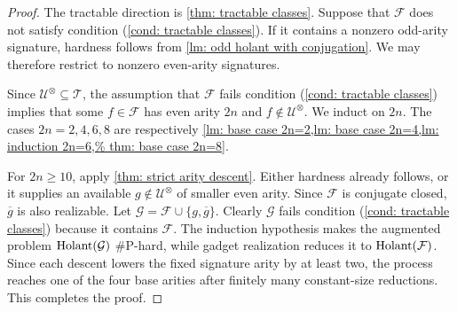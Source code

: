 \begin{proof}
The tractable direction is \cref{thm: tractable classes}.  Suppose that
$\mathcal F$ does not satisfy condition
\rm{(\ref{cond: tractable classes})}.  If it contains a nonzero odd-arity
signature, hardness follows from
\cref{lm: odd holant with conjugation}.  We may therefore restrict to
nonzero even-arity signatures.

Since $\mathcal U^{\otimes}\subseteq\mathscr T$, the assumption that
$\mathcal F$ fails condition \rm{(\ref{cond: tractable classes})} implies
that some $f\in\mathcal F$ has even arity $2n$ and
$f\notin\mathcal U^{\otimes}$.  We induct on $2n$.  The cases
$2n=2,4,6,8$ are respectively
\cref{lm: base case 2n=2,lm: base case 2n=4,lm: induction 2n=6,%
thm: base case 2n=8}.

For $2n\geq10$, apply \cref{thm: strict arity descent}.  Either hardness
already follows, or it supplies an available
$g\notin\mathcal U^{\otimes}$ of smaller even arity.  
Since $\mathcal{F}$ is conjugate closed, $\overline{g}$ is also realizable.
Let $\mathcal{G}=\mathcal{F}\cup\{g,
\overline{g}\}$.
Clearly $\mathcal{G}$ fails
condition \rm{(\ref{cond: tractable classes})} because it contains $\mathcal{F}.$
The induction hypothesis makes the augmented problem $\operatorname{Holant}(\mathcal{G})$
\#P-hard, while gadget realization reduces it to
$\operatorname{Holant}(\mathcal F)$.  
Since each descent lowers the fixed signature
arity by at least two, the process reaches one of the four base arities
after finitely many constant-size reductions.  This completes the proof.
\end{proof}
